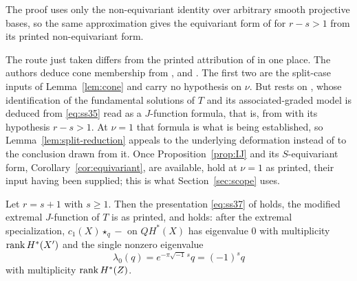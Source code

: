 The proof uses only the non-equivariant identity over arbitrary smooth
projective bases, so the same approximation gives the equivariant form of
\cite[Theorem~4.4]{SS} for \(r-s>1\) from its printed non-equivariant form.

\begin{remark}
  \label{rem:circularity}
  The route just taken differs from the printed attribution of
  \cite[Remark~4.5(3)]{SS} in one place.  The authors deduce cone membership
  from \cite{Brown}, \cite{CoatesGivental} and \cite[Lemma~9.6]{SS}.  The
  first two are the split-case inputs of Lemma~\ref{lem:cone} and carry no
  hypothesis on \(\nu\).  But \cite[Lemma~9.6]{SS} rests on
  \cite[Lemma~9.4]{SS}, whose identification of the fundamental solutions of
  \(T\) and its associated-graded model is deduced from \eqref{eq:ss35}
  read as a \(J\)-function formula, that is, from \cite[Theorem~4.4]{SS} with
  its hypothesis \(r-s>1\).  At \(\nu=1\) that formula is what is being
  established, so Lemma~\ref{lem:split-reduction} appeals to the underlying
  deformation instead of to the conclusion drawn from it.  Once
  Proposition~\ref{prop:IJ} and its \(S\)-equivariant form,
  Corollary~\ref{cor:equivariant}, are available, \cite[Lemmas~9.4--9.6]{SS}
  hold at \(\nu=1\) as printed, their input having been supplied; this is
  what Section~\ref{sec:scope} uses.
\end{remark}

\begin{corollary}
  \label{cor:presentation}
  Let \(r=s+1\) with \(s\ge1\).  Then the presentation \eqref{eq:ss37} of
  \cite[Theorem~4.6]{SS} holds, the modified extremal \(J\)-function
  \cite[(39)--(40)]{SS} of \(T\) is as printed, and
  \cite[Theorem~1.2]{SS} holds: after the extremal
  specialization, \(c_{1}(X)\star_{q}-\) on \(QH^{*}(X)\) has eigenvalue
  \(0\) with multiplicity \(\operatorname{rank} H^{*}(X')\) and the single nonzero
  eigenvalue
  \[
    \lambda_{0}(q)=e^{-\pi\sqrt{-1}\,s}q=(-1)^{s}q
  \]
  with multiplicity \(\operatorname{rank} H^{*}(Z)\).
\end{corollary}

